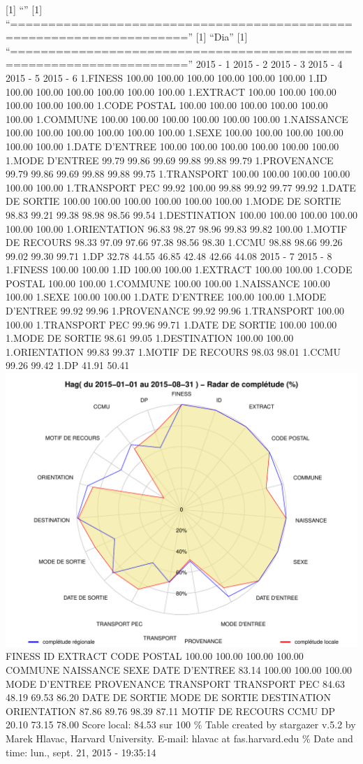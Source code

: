 \documentclass[]{article}
\begin{document}
{[}1{]} ``'' {[}1{]}
``=====================================================================''
{[}1{]} ``Dia'' {[}1{]}
``=====================================================================''
2015 - 1 2015 - 2 2015 - 3 2015 - 4 2015 - 5 2015 - 6 1.FINESS 100.00
100.00 100.00 100.00 100.00 100.00 1.ID 100.00 100.00 100.00 100.00
100.00 100.00 1.EXTRACT 100.00 100.00 100.00 100.00 100.00 100.00 1.CODE
POSTAL 100.00 100.00 100.00 100.00 100.00 100.00 1.COMMUNE 100.00 100.00
100.00 100.00 100.00 100.00 1.NAISSANCE 100.00 100.00 100.00 100.00
100.00 100.00 1.SEXE 100.00 100.00 100.00 100.00 100.00 100.00 1.DATE
D'ENTREE 100.00 100.00 100.00 100.00 100.00 100.00 1.MODE D'ENTREE 99.79
99.86 99.69 99.88 99.88 99.79 1.PROVENANCE 99.79 99.86 99.69 99.88 99.88
99.75 1.TRANSPORT 100.00 100.00 100.00 100.00 100.00 100.00 1.TRANSPORT
PEC 99.92 100.00 99.88 99.92 99.77 99.92 1.DATE DE SORTIE 100.00 100.00
100.00 100.00 100.00 100.00 1.MODE DE SORTIE 98.83 99.21 99.38 98.98
98.56 99.54 1.DESTINATION 100.00 100.00 100.00 100.00 100.00 100.00
1.ORIENTATION 96.83 98.27 98.96 99.83 99.82 100.00 1.MOTIF DE RECOURS
98.33 97.09 97.66 97.38 98.56 98.30 1.CCMU 98.88 98.66 99.26 99.02 99.30
99.71 1.DP 32.78 44.55 46.85 42.48 42.66 44.08 2015 - 7 2015 - 8
1.FINESS 100.00 100.00 1.ID 100.00 100.00 1.EXTRACT 100.00 100.00 1.CODE
POSTAL 100.00 100.00 1.COMMUNE 100.00 100.00 1.NAISSANCE 100.00 100.00
1.SEXE 100.00 100.00 1.DATE D'ENTREE 100.00 100.00 1.MODE D'ENTREE 99.92
99.96 1.PROVENANCE 99.92 99.96 1.TRANSPORT 100.00 100.00 1.TRANSPORT PEC
99.96 99.71 1.DATE DE SORTIE 100.00 100.00 1.MODE DE SORTIE 98.61 99.05
1.DESTINATION 100.00 100.00 1.ORIENTATION 99.83 99.37 1.MOTIF DE RECOURS
98.03 98.01 1.CCMU 99.26 99.42 1.DP 41.91 50.41
\includegraphics{completude_files/figure-latex/finess-6.pdf} FINESS ID
EXTRACT CODE POSTAL 100.00 100.00 100.00 100.00 COMMUNE NAISSANCE SEXE
DATE D'ENTREE 83.14 100.00 100.00 100.00 MODE D'ENTREE PROVENANCE
TRANSPORT TRANSPORT PEC 84.63 48.19 69.53 86.20 DATE DE SORTIE MODE DE
SORTIE DESTINATION ORIENTATION 87.86 89.76 98.39 87.11 MOTIF DE RECOURS
CCMU DP 20.10 73.15 78.00 Score local: 84.53 sur 100 \% Table created by
stargazer v.5.2 by Marek Hlavac, Harvard University. E-mail: hlavac at
fas.harvard.edu \% Date and time: lun., sept. 21, 2015 - 19:35:14
\end{document}

